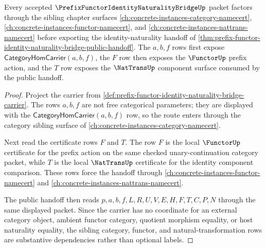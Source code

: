 \begin{theorem}
\label{thm:prefix-functor-identity-naturality-category-functor-route}
Every accepted $\PrefixFunctorIdentityNaturalityBridgeUp$ packet factors through the sibling chapter surfaces \autoref{ch:concrete-instances-category-namecert}, \autoref{ch:concrete-instances-functor-namecert}, and \autoref{ch:concrete-instances-nattrans-namecert} before exporting the identity-naturality handoff of \autoref{thm:prefix-functor-identity-naturality-bridge-public-handoff}. The $a,b,f$ rows first expose $\mathsf{CategoryHomCarrier}(a,b,f)$, the $F$ row then exposes the $\FunctorUp$ prefix action, and the $T$ row exposes the $\NatTransUp$ component surface consumed by the public handoff.
\end{theorem}
\begin{proof}
Project the carrier from \autoref{def:prefix-functor-identity-naturality-bridge-carrier}. The rows $a,b,f$ are not free categorical parameters; they are displayed with the $\mathsf{CategoryHomCarrier}(a,b,f)$ row, so the route enters through the category sibling surface of \autoref{ch:concrete-instances-category-namecert}.

Next read the certificate rows $F$ and $T$. The row $F$ is the local $\FunctorUp$ certificate for the prefix action on the same checked unary-continuation category packet, while $T$ is the local $\NatTransUp$ certificate for the identity component comparison. These rows force the handoff through \autoref{ch:concrete-instances-functor-namecert} and \autoref{ch:concrete-instances-nattrans-namecert}.

The public handoff then reads $p,a,b,f,L,R,U,V,E,H,F,T,C,P,N$ through the same displayed packet. Since the carrier has no coordinate for an external category object, ambient functor category, quotient morphism equality, or host naturality equality, the sibling category, functor, and natural-transformation rows are substantive dependencies rather than optional labels.
\end{proof}



